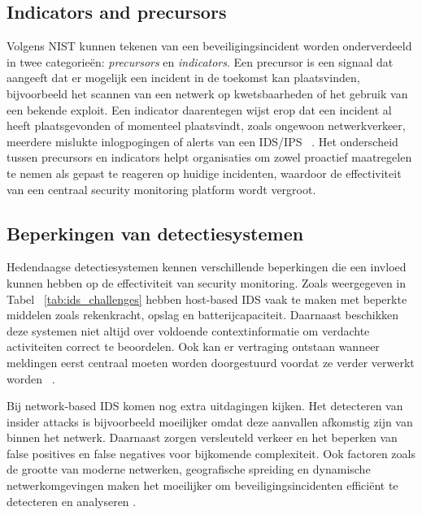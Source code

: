 \subsection{Indicators and precursors}
Volgens NIST kunnen tekenen van een beveiligingsincident worden onderverdeeld in twee categorieën: \textit{precursors} en \textit{indicators}. Een precursor is een signaal dat aangeeft dat er mogelijk een incident in de toekomst kan plaatsvinden, bijvoorbeeld het scannen van een netwerk op kwetsbaarheden of het gebruik van een bekende exploit. Een indicator daarentegen wijst erop dat een incident al heeft plaatsgevonden of momenteel plaatsvindt, zoals ongewoon netwerkverkeer, meerdere mislukte inlogpogingen of alerts van een IDS/IPS ~\autocite{nist80061r3}. Het onderscheid tussen precursors en indicators helpt organisaties om zowel proactief maatregelen te nemen als gepast te reageren op huidige incidenten, waardoor de effectiviteit van een centraal security monitoring platform wordt vergroot.

\subsection{Beperkingen van detectiesystemen}
Hedendaagse detectiesystemen kennen verschillende beperkingen die een invloed kunnen hebben op de effectiviteit van security monitoring. Zoals weergegeven in Tabel ~\ref{tab:ids_challenges} hebben host-based IDS vaak te maken met beperkte middelen zoals rekenkracht, opslag en batterijcapaciteit. Daarnaast beschikken deze systemen niet altijd over voldoende contextinformatie om verdachte activiteiten correct te beoordelen. Ook kan er vertraging ontstaan wanneer meldingen eerst centraal moeten worden doorgestuurd voordat ze verder verwerkt worden ~\autocite{raponi2019}.

Bij network-based IDS komen nog extra uitdagingen kijken. Het detecteren van insider attacks is bijvoorbeeld moeilijker omdat deze aanvallen afkomstig zijn van binnen het netwerk. Daarnaast zorgen versleuteld verkeer en het beperken van false positives en false negatives voor bijkomende complexiteit. Ook factoren zoals de grootte van moderne netwerken, geografische spreiding en dynamische netwerkomgevingen maken het moeilijker om beveiligingsincidenten efficiënt te detecteren en analyseren \autocite{raponi2019}.

